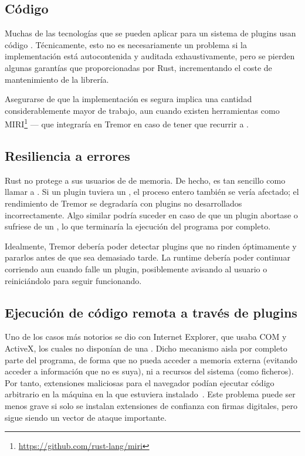 \subsection{Código \unsafe}

Muchas de las tecnologías que se pueden aplicar para un sistema de plugins usan
código \unsafe. Técnicamente, esto no es necesariamente un problema si la
implementación está autocontenida y auditada exhaustivamente, pero se pierden
algunas garantías que proporcionadas por Rust, incrementando el coste de
mantenimiento de la librería.

Asegurarse de que la implementación es segura implica una cantidad
considerablemente mayor de trabajo, aun cuando existen herramientas como
MIRI\footnote{\url{https://github.com/rust-lang/miri}} --- que integraría en
Tremor en caso de tener que recurrir a \unsafe.

\subsection{Resiliencia a errores}

Rust no protege a sus usuarios de \leaks de memoria. De hecho, es tan sencillo
como llamar a . Si un plugin tuviera un \leak, el proceso
entero también se vería afectado; el rendimiento de Tremor se degradaría con
plugins no desarrollados incorrectamente. Algo similar podría suceder en caso de
que un plugin abortase o sufriese de un \panic, lo que terminaría la ejecución
del programa por completo.

Idealmente, Tremor debería poder detectar plugins que no rinden óptimamente y
pararlos antes de que sea demasiado tarde. La runtime debería poder continuar
corriendo aun cuando falle un plugin, posiblemente avisando al usuario o
reiniciándolo para seguir funcionando.

\subsection{Ejecución de código remota a través de plugins}

Uno de los casos más notorios se dio con Internet Explorer, que usaba COM y
ActiveX, los cuales no disponían de una \sandbox. Dicho mecanismo aisla por
completo parte del programa, de forma que no pueda acceder a memoria externa
(evitando acceder a información que no es suya), ni a recursos del sistema (como
ficheros). Por tanto, extensiones maliciosas para el navegador podían ejecutar
código arbitrario en la máquina en la que estuviera instalado~\cite{iesandbox}.
Este problema puede ser menos grave si solo se instalan extensiones de confianza
con firmas digitales, pero sigue siendo un vector de ataque importante.

